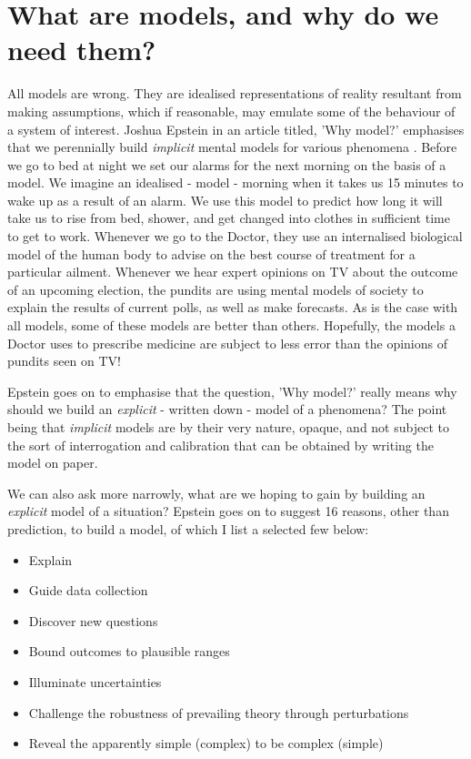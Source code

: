 \documentclass[11pt,fullpage]{book}
\begin{document}
\section{What are models, and why do we need them?}
All models are wrong. They are idealised representations of reality resultant from making assumptions, which if reasonable, may emulate some of the behaviour of a system of interest. Joshua Epstein in an article titled, 'Why model?' emphasises that we perennially build \textit{implicit} mental models for various phenomena \cite{epstein2008model}. Before we go to bed at night we set our alarms for the next morning on the basis of a model. We imagine an idealised - model - morning when it takes us 15 minutes to wake up as a result of an alarm. We use this model to predict how long it will take us to rise from bed, shower, and get changed into clothes in sufficient time to get to work. Whenever we go to the Doctor, they use an internalised biological model of the human body to advise on the best course of treatment for a particular ailment. Whenever we hear expert opinions on TV about the outcome of an upcoming election, the pundits are using mental models of society to explain the results of current polls, as well as make forecasts. As is the case with all models, some of these models are better than others. Hopefully, the models a Doctor uses to prescribe medicine are subject to less error than the opinions of pundits seen on TV! 

Epstein goes on to emphasise that the question, 'Why model?' really means why should we build an \textit{explicit} - written down - model of a phenomena? The point being that \textit{implicit} models are by their very nature, opaque, and not subject to the sort of interrogation and calibration that can be obtained by writing the model on paper. 

We can also ask more narrowly, what are we hoping to gain by building an \textit{explicit} model of a situation? Epstein goes on to suggest 16 reasons, other than prediction, to build a model, of which I list a selected few below:

\begin{itemize}
\item Explain
\item Guide data collection
\item Discover new questions
\item Bound outcomes to plausible ranges
\item Illuminate uncertainties
\item Challenge the robustness of prevailing theory through perturbations
\item Reveal the apparently simple (complex) to be complex (simple) 
\end{itemize}
\end{document}
